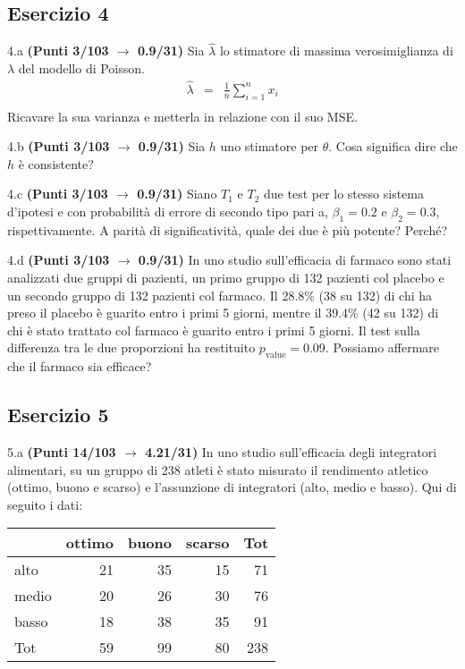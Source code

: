 \documentclass[
  11pt,
]{book}
\theoremstyle{mytheoremstyle}
\theoremstyle{mydefstyle}
\begin{document}
\subsection{Esercizio 4}\label{esercizio-4-22}

4.a \textbf{(Punti 3/103 \(\rightarrow\) 0.9/31)} Sia \(\hat \lambda\) lo stimatore di massima verosimiglianza di \(\lambda\) del modello di Poisson.
\begin{eqnarray*}
  \hat\lambda &=&  \frac 1n\sum_{i=1}^nx_i\\
\end{eqnarray*}
Ricavare la sua varianza e metterla in relazione con il suo MSE.

4.b \textbf{(Punti 3/103 \(\rightarrow\) 0.9/31)} Sia \(h\) uno stimatore per \(\theta\). Cosa significa dire che \(h\) è consistente?

4.c \textbf{(Punti 3/103 \(\rightarrow\) 0.9/31)} Siano \(T_1\) e \(T_2\) due test per lo stesso sistema d'ipotesi e con probabilità di errore di secondo tipo pari a, \(\beta_1=0.2\) e \(\beta_2=0.3\), rispettivamente. A parità di significatività, quale dei due è più potente? Perché?

4.d \textbf{(Punti 3/103 \(\rightarrow\) 0.9/31)} In uno studio sull'efficacia di farmaco sono stati analizzati due gruppi di pazienti, un primo gruppo di 132 pazienti col placebo e un secondo gruppo di 132 pazienti col farmaco. Il 28.8\% (38 su 132) di chi ha preso il placebo è guarito entro i primi 5 giorni, mentre il 39.4\% (42 su 132) di chi è stato trattato col farmaco è guarito entro i primi 5 giorni. Il test sulla differenza tra le due proporzioni ha restituito \(p_\text{value}=0.09\). Possiamo affermare che il farmaco sia efficace?

\subsection{Esercizio 5}\label{esercizio-5-20}

5.a \textbf{(Punti 14/103 \(\rightarrow\) 4.21/31)} In uno studio sull'efficacia degli integratori alimentari, su un gruppo di 238 atleti è stato misurato il rendimento atletico (ottimo, buono e scarso) e l'assunzione di integratori (alto, medio e basso). Qui di seguito i dati:

\begin{table}[H]
\centering
\begin{tabular}{lrrrr}
\toprule
  & ottimo & buono & scarso & Tot\\
\midrule
alto & 21 & 35 & 15 & 71\\
medio & 20 & 26 & 30 & 76\\
basso & 18 & 38 & 35 & 91\\
Tot & 59 & 99 & 80 & 238\\
\bottomrule
\end{tabular}
\end{table}
\end{document}
